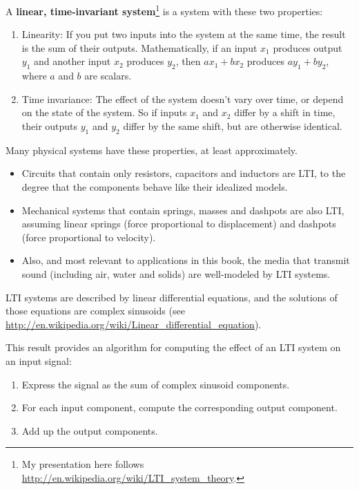 \documentclass[12pt]{book}
\begin{document}
A {\bf linear, time-invariant system}\footnote{My presentation here
  follows \url{http://en.wikipedia.org/wiki/LTI_system_theory}.} is a
system with these two properties:

\begin{enumerate}

\item Linearity: If you put two inputs into the system at the same
  time, the result is the sum of their outputs.  Mathematically, if an
  input $x_1$ produces output $y_1$ and another input $x_2$ produces
  $y_2$, then $a x_1 + b x_2$ produces $a y_1 + b y_2$, where $a$ and
  $b$ are scalars.

\item Time invariance: The
  effect of the system doesn't vary over time, or depend on the state
  of the system.  So if inputs $x_1$ and $x_2$ differ by a shift in time,
  their outputs $y_1$ and $y_2$ differ by the same shift, but are otherwise
  identical.

\end{enumerate}

Many physical systems have these properties, at least approximately.

\begin{itemize}

\item Circuits that contain only resistors, capacitors and inductors are
LTI, to the degree that the components behave like their idealized
models.

\item Mechanical systems that contain springs, masses and
dashpots are also LTI, assuming linear springs (force proportional
to displacement) and dashpots (force proportional to velocity).

\item Also, and most relevant to applications in this book,
the media that transmit sound (including air, water
and solids) are well-modeled by LTI systems.

\end{itemize}

LTI systems are described by linear differential equations, and
the solutions of those equations are complex sinusoids (see
\url{http://en.wikipedia.org/wiki/Linear_differential_equation}).

This result provides an algorithm for computing the effect of
an LTI system on an input signal:

\begin{enumerate}

\item Express the signal as the sum of complex sinusoid components.

\item For each input component, compute the corresponding output component.

\item Add up the output components.

\end{enumerate}
\end{document}
